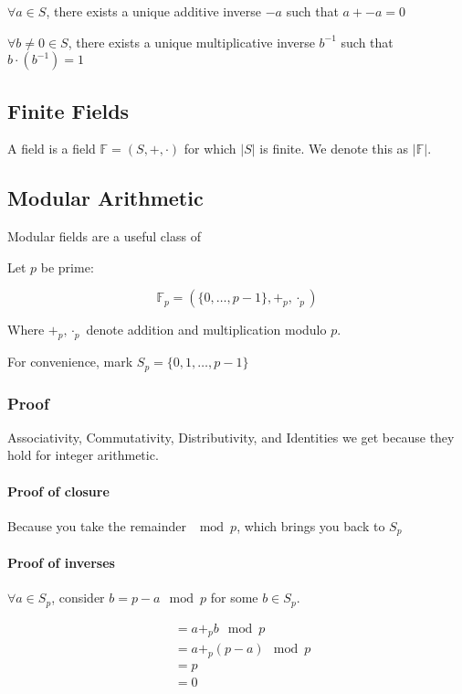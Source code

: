 \documentclass{idc_msc}
\begin{document}
\(\forall a \in S\), there exists a unique additive inverse \(-a\) such that \(a + -a = 0\)

\(\forall b \ne 0 \in S\), there exists a unique multiplicative inverse \(b^{-1}\) such that \(b \cdot (b^{-1}) = 1\)

\subsection{Finite Fields}

A  field is a field \(\mathbb{F}=(S,+,\cdot)\) for which \(|S|\) is finite.
We denote this as \(|\mathbb{F}|\).

\subsection{Modular Arithmetic}

Modular fields are a useful class of 

Let \(p\) be prime:

\[\mathbb{F}_p = (\{0,\ldots,p-1\}, +_p, \cdot_p)\]

Where \(+_p, \cdot_p\) denote addition and multiplication modulo \(p\).

For convenience, mark \(S_p=\{0,1,\ldots,p-1\}\)

\subsubsection{Proof}

Associativity, Commutativity, Distributivity, and Identities we get because they hold for integer arithmetic.

\paragraph{Proof of closure}

Because you take the remainder \(\mod p\), which brings you back to \(S_p\)

\paragraph{Proof of inverses}

\(\forall a \in S_p\), consider \(b = p - a \mod p\) for some \(b \in S_p\).

\[
\begin{aligned}
& = a +_p b \mod p \\
& = a +_p (p - a) \mod p \\
& = p \\
& = 0
\end{aligned}
\]
\end{document}
